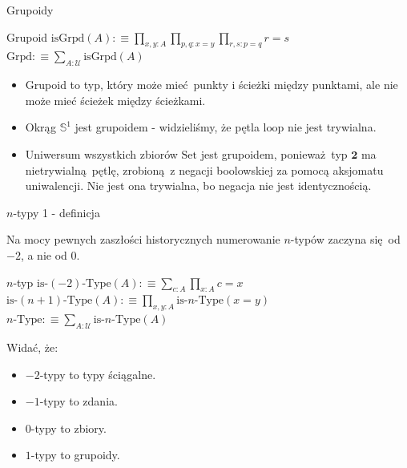 \documentclass{beamer}
\newcommand{\defn}{:\equiv}
\newcommand{\U}{\mathcal{U}}
\newcommand{\isGrpd}{\text{isGrpd}}
\newcommand{\Set}{\text{Set}}
\newcommand{\Grpd}{\text{Grpd}}
\newcommand{\hS}{\mathbb{S}^1}
\newcommand{\looop}{\text{loop}}
\begin{document}
\begin{frame}{Grupoidy}

\begin{block}{Grupoid}
$\isGrpd(A) \defn \prod_{x, y : A} \prod_{p, q : x = y} \prod_{r, s : p = q} r = s$ \\
$\Grpd \defn \sum_{A : \U} \isGrpd(A)$
\end{block}

\begin{itemize}
	\item Grupoid to typ, który może mieć punkty i ścieżki między punktami, ale nie może mieć ścieżek między ścieżkami.
	\item Okrąg $\hS$ jest grupoidem - widzieliśmy, że pętla $\looop$ nie jest trywialna.
	\item Uniwersum wszystkich zbiorów $\Set$ jest grupoidem, ponieważ typ $\textbf{2}$ ma nietrywialną pętlę, zrobioną z negacji boolowskiej za pomocą aksjomatu uniwalencji. Nie jest ona trywialna, bo negacja nie jest identycznością.
\end{itemize}

\end{frame}

\begin{frame}{$n$-typy 1 - definicja}

Na mocy pewnych zaszłości historycznych numerowanie $n$-typów zaczyna się od $-2$, a nie od $0$.

\begin{block}{$n$-typ}
$\text{is-}(-2)\text{-Type}(A) \defn \sum_{c : A} \prod_{x : A} c = x$ \\
$\text{is-}(n + 1)\text{-Type}(A) \defn \prod_{x, y : A} \text{is-}n\text{-Type}(x = y)$ \\
$n\text{-Type} \defn \sum_{A : \U} \text{is-}n\text{-Type}(A)$
\end{block}

Widać, że:
\begin{itemize}
	\item $-2$-typy to typy ściągalne.
	\item $-1$-typy to zdania.
	\item $0$-typy to zbiory.
	\item $1$-typy to grupoidy.
\end{itemize}

\end{frame}
\end{document}
